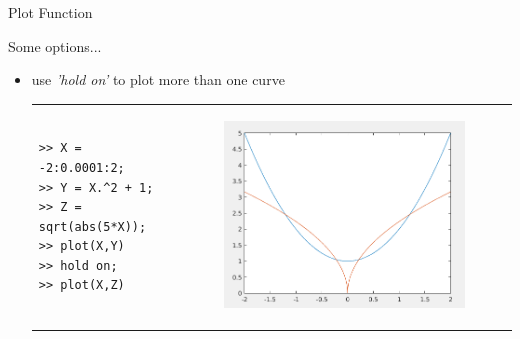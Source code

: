 \documentclass{beamer}
\begin{document}
\begin{frame}[fragile]{Plot Function}
	\begin{block}{Some options...}
		\begin{itemize}
			\item use \textit{'hold on'} to plot more than one curve
			\vspace{10pt}
			\begin{tabular}{p{0.4\textwidth}p{}}
			\begin{minipage}{}
			\java
				\begin{lstlisting}
>> X = -2:0.0001:2;
>> Y = X.^2 + 1;
>> Z = sqrt(abs(5*X));
>> plot(X,Y)
>> hold on;
>> plot(X,Z)
				\end{lstlisting}
			
			\end{minipage}
			&
			\begin{minipage}{0.4\textwidth}
			\begin{figure}[H]
				\centering
				\includegraphics[scale=0.25]{./Imgs/plot2.png}
			\end{figure}
			
			\end{minipage}
			\end{tabular}
		\end{itemize}
	\end{block}
\end{frame}
\end{document}

